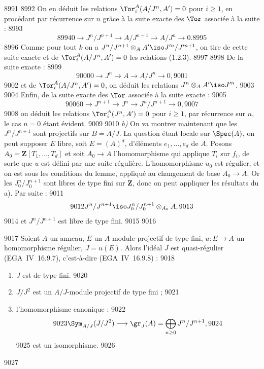   8991	
  8992	On en d\'eduit les relations $\Tor_i^A(A/J^n, A') = 0$ pour $i \geq 1$, en proc\'edant par r\'ecurrence sur $n$ gr\^ace \`a la suite exacte des $\Tor$ associ\'ee \`a la suite :
  8993	\[
  8994	0 \longrightarrow J^n/J^{n+1} \longrightarrow A/J^{n+1} \longrightarrow A/J^n \longrightarrow 0.
  8995	\]
  8996	Comme pour tout $k$ on a $J^n/J^{n+1} \otimes_A A' \iso J'^n/J'^{n+1}$, on tire de cette suite exacte et de $\Tor_i^A(A/J^n, A') = 0$ les relations (1.2.3).
  8997	
  8998	De la suite exacte :
  8999	\[
  9000	0 \longrightarrow J^n \longrightarrow A \longrightarrow A/J^n \longrightarrow 0,
  9001	\]
  9002	et de $\Tor_i^A(A/J^n, A') = 0$, on d\'eduit les relations $J^n \otimes_A A' \iso J'^n$.
  9003	
  9004	Enfin, de la suite exacte des $\Tor$ associ\'ee \`a la suite exacte :
  9005	\[
  9006	0 \longrightarrow J^{n+1} \longrightarrow J^n \longrightarrow J^n/J^{n+1} \longrightarrow 0,
  9007	\]
  9008	on d\'eduit les relations $\Tor_i^A(J^n, A') = 0$ pour $i \geq 1$, par r\'ecurrence sur $n$, le cas $n = 0$ \'etant \'evident.
  9009	
  9010	\emph{b)} On va montrer maintenant que les $J^n/J^{n+1}$ sont projectifs sur $B = A/J$. La question \'etant locale sur $\Spec(A)$, on peut supposer $E$ libre, soit $E = (A)^d$, d'\'el\'ements $e_1,\dots,e_d$ de $A$. Posons $A_0 = \mathbf{Z}[T_1,\dots,T_d]$ et soit $A_0 \to A$ l'homomorphisme qui applique $T_i$ sur $f_i$, de sorte que $u$ est d\'efini par une suite r\'eguli\`ere. L'homomorphisme $u_0$ est r\'egulier, et on est sous les conditions du lemme, appliqu\'e au changement de base $A_0 \to A$. Or les $J_0^n/J_0^{n+1}$ sont libres de type fini sur $\mathbf{Z}$, donc on peut appliquer les r\'esultats du a). Par suite :
  9011	\[
  9012	J^n/J^{n+1} \iso J_0^n/J_0^{n+1} \otimes_{A_0} A,
  9013	\]
  9014	et $J^n/J^{n+1}$ est libre de type fini.
  9015	
  9016	\begin{proposition}[1.3]
  9017	Soient $A$ un anneau, $E$ un $A$-module projectif de type fini, $u: E \to A$ un homomorphisme r\'egulier, $J = u(E)$. Alors l'id\'eal $J$ est quasi-r\'egulier (EGA~IV~16.9.7), c'est-\`a-dire (EGA~IV~16.9.8) :
  9018	\begin{enumerate}[label=\roman*)]
  9019	\item $J$ est de type fini.
  9020	\item $J/J^2$ est un $A/J$-module projectif de type fini ;
  9021	\item l'homomorphisme canonique :
  9022	\begin{equation}\label{eq:1.3.1}
  9023	\Sym_{A/J}(J/J^2) \longrightarrow \gr_J(A) = \bigoplus_{n \geq 0} J^n/J^{n+1},
  9024	\end{equation}
  9025	est un isomorphisme.
  9026	\end{enumerate}
  9027	\end{proposition}
